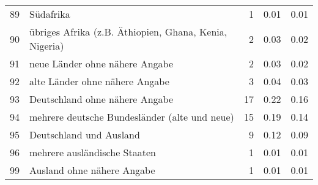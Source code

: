 \begin{longtable}{lXrrr}
        89 & \multicolumn{1}{X}{Südafrika} & %
          \num{1} &
          \num[round-mode=places,round-precision=2]{0,01} &
          \num[round-mode=places,round-precision=2]{0,01} \\

        90 & \multicolumn{1}{X}{übriges Afrika (z.B. Äthiopien, Ghana, Kenia, Nigeria)} & %
          \num{2} &
          \num[round-mode=places,round-precision=2]{0,03} &
          \num[round-mode=places,round-precision=2]{0,02} \\

        91 & \multicolumn{1}{X}{neue Länder ohne nähere Angabe} & %
          \num{2} &
          \num[round-mode=places,round-precision=2]{0,03} &
          \num[round-mode=places,round-precision=2]{0,02} \\

        92 & \multicolumn{1}{X}{alte Länder ohne nähere Angabe} & %
          \num{3} &
          \num[round-mode=places,round-precision=2]{0,04} &
          \num[round-mode=places,round-precision=2]{0,03} \\

        93 & \multicolumn{1}{X}{Deutschland ohne nähere Angabe} & %
          \num{17} &
          \num[round-mode=places,round-precision=2]{0,22} &
          \num[round-mode=places,round-precision=2]{0,16} \\

        94 & \multicolumn{1}{X}{mehrere deutsche Bundesländer (alte und neue)} & %
          \num{15} &
          \num[round-mode=places,round-precision=2]{0,19} &
          \num[round-mode=places,round-precision=2]{0,14} \\

        95 & \multicolumn{1}{X}{Deutschland und Ausland} & %
          \num{9} &
          \num[round-mode=places,round-precision=2]{0,12} &
          \num[round-mode=places,round-precision=2]{0,09} \\

        96 & \multicolumn{1}{X}{mehrere ausländische Staaten} & %
          \num{1} &
          \num[round-mode=places,round-precision=2]{0,01} &
          \num[round-mode=places,round-precision=2]{0,01} \\

        99 & \multicolumn{1}{X}{Ausland ohne nähere Angabe} & %
          \num{1} &
          \num[round-mode=places,round-precision=2]{0,01} &
          \num[round-mode=places,round-precision=2]{0,01} \\


\end{longtable}
